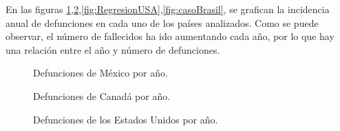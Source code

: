 \documentclass[12pt]{article}
\begin{document}
En las figuras \ref{fig:casoMexico},\ref{fig:casoCanada},\ref{fig:RegresionUSA},\ref{fig:casoBrasil}, se grafican la incidencia anual de defunciones en cada uno de los países analizados. 
Como se puede observar, el número de fallecidos ha ido aumentando cada año, por lo que hay una relación entre el año y número de defunciones. 


\begin{figure}[H]
%
\hfill
\caption{Defunciones de México por año.}
\label{fig:casoMexico}
\end{figure}

\begin{figure}[H]
%
\hfill
\caption{Defunciones de Canadá por año.}
\label{fig:casoCanada}
\end{figure}

\begin{figure}[H]
%
\hfill
\caption{Defunciones de los Estados Unidos por año.}
\label{fig:casoUsa}
\end{figure}
\end{document}
